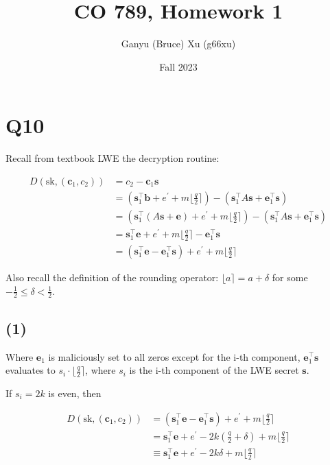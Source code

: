 \documentclass{article}
\title{CO 789, Homework 1}
\author{Ganyu (Bruce) Xu (g66xu)}
\date{Fall 2023}
\newcommand{\round}[1]{\lfloor {#1} \rceil}
\begin{document}

\section*{Q10}
Recall from textbook LWE the decryption routine:

$$
\begin{aligned}
D(\text{sk}, (\mathbf{c}_1, c_2))
&= c_2 - \mathbf{c}_1\mathbf{s} \\
&= (\mathbf{s}_1^\intercal\mathbf{b} + e^\prime + m\round{\frac{q}{2}}) 
    - (\mathbf{s}_1^\intercal A\mathbf{s} + \mathbf{e}_1^\intercal\mathbf{s}) \\
&= (\mathbf{s}_1^\intercal(A\mathbf{s} + \mathbf{e}) + e^\prime + m\round{\frac{q}{2}}) 
    - (\mathbf{s}_1^\intercal A\mathbf{s} + \mathbf{e}_1^\intercal\mathbf{s}) \\
&= \mathbf{s}_1^\intercal\mathbf{e} + e^\prime + m\round{\frac{q}{2}} - \mathbf{e}_1^\intercal\mathbf{s} \\
&= (\mathbf{s}_1^\intercal\mathbf{e} - \mathbf{e}_1^\intercal\mathbf{s}) + e^\prime + m\round{\frac{q}{2}}
\end{aligned}
$$

Also recall the definition of the rounding operator: $\round{a} = a + \delta$ for some $-\frac{1}{2} \leq \delta < \frac{1}{2}$.

\subsection*{(1)}
Where $\mathbf{e}_1$ is maliciously set to all zeros except for the i-th component, $\mathbf{e}_1^\intercal \mathbf{s}$ evaluates to $s_i \cdot \round{\frac{q}{2}}$, where $s_i$ is the i-th component of the LWE secret $\mathbf{s}$.

If $s_i = 2k$ is even, then

$$
\begin{aligned}
D(\text{sk}, (\mathbf{c}_1, c_2)) 
&= (\mathbf{s}_1^\intercal\mathbf{e} - \mathbf{e}_1^\intercal\mathbf{s}) + e^\prime + m\round{\frac{q}{2}} \\
&= \mathbf{s}_1^\intercal\mathbf{e} + e^\prime - 2k(\frac{q}{2} + \delta) + m\round{\frac{q}{2}} \\
&\equiv  \mathbf{s}_1^\intercal\mathbf{e} + e^\prime - 2k\delta + m\round{\frac{q}{2}} \\
\end{aligned}
$$
\end{document}
